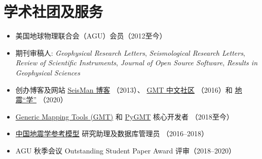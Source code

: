 \section{学术社团及服务}

\begin{itemize}
\item 美国地球物理联合会（AGU）会员（2012至今）
\item 期刊审稿人:
      \emph{Geophysical Research Letters},
      \emph{Seismological Research Letters},
      \emph{Review of Scientific Instruments},
      \emph{Journal of Open Source Software},
      \emph{Results in Geophysical Sciences}
\item 创办博客及网站
	  \href{https://blog.seisman.info}{SeisMan 博客} （2013）、
	  \href{http://gmt-china.org/}{GMT 中文社区} （2016）和
	  \href{https://seismo-learn.org/}{地震``学''} （2020）
\item \href{https://github.com/GenericMappingTools/gmt}{Generic Mapping Tools (GMT)} 和
	  \href{https://github.com/GenericMappingTools/pygmt}{PyGMT} 核心开发者 （2018至今）
\item \href{http://chinageorefmodel.org/}{中国地震学参考模型} 研究助理及数据库管理员 （2016--2018）
\item AGU 秋季会议 Outstanding Student Paper Award 评审（2018--2020）
\end{itemize}
